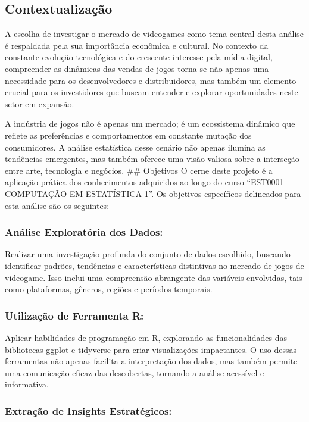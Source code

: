 \documentclass[draft]{agujournal2018}
\begin{document}
\subsection{Contextualização}

A escolha de investigar o mercado de videogames como tema central desta
análise é respaldada pela sua importância econômica e cultural. No
contexto da constante evolução tecnológica e do crescente interesse pela
mídia digital, compreender as dinâmicas das vendas de jogos torna-se não
apenas uma necessidade para os desenvolvedores e distribuidores, mas
também um elemento crucial para os investidores que buscam entender e
explorar oportunidades neste setor em expansão.

A indústria de jogos não é apenas um mercado; é um ecossistema dinâmico
que reflete as preferências e comportamentos em constante mutação dos
consumidores. A análise estatística desse cenário não apenas ilumina as
tendências emergentes, mas também oferece uma visão valiosa sobre a
interseção entre arte, tecnologia e negócios. \#\# Objetivos O cerne
deste projeto é a aplicação prática dos conhecimentos adquiridos ao
longo do curso ``EST0001 - COMPUTAÇÃO EM ESTATÍSTICA 1''. Os objetivos
específicos delineados para esta análise são os seguintes:

\subsubsection{Análise Exploratória dos Dados:}

Realizar uma investigação profunda do conjunto de dados escolhido,
buscando identificar padrões, tendências e características distintivas
no mercado de jogos de videogame. Isso inclui uma compreensão abrangente
das variáveis envolvidas, tais como plataformas, gêneros, regiões e
períodos temporais.

\subsubsection{Utilização de Ferramenta R:}

Aplicar habilidades de programação em R, explorando as funcionalidades
das bibliotecas ggplot e tidyverse para criar visualizações impactantes.
O uso dessas ferramentas não apenas facilita a interpretação dos dados,
mas também permite uma comunicação eficaz das descobertas, tornando a
análise acessível e informativa.

\subsubsection{Extração de Insights Estratégicos:}
\end{document}
